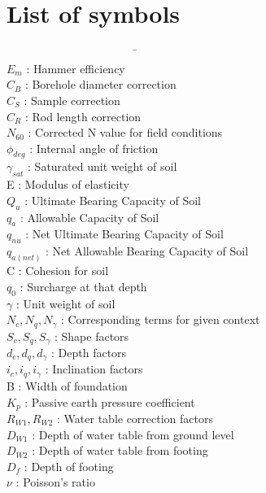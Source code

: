 \chapter*{List of symbols}
\begin{tabbing}
~~~~~~~~~~~~~~~~~~~~~~~\= ~~~~~~~~~~~~~~~~\= \\%
$E_m$ \> : \> Hammer efficiency\\
$C_B$ \> : \> Borehole diameter correction\\
$C_S$ \> : \> Sample correction\\
$C_R$ \> : \> Rod length correction\\
$N_{60}$ \> : \> Corrected N value for field conditions\\
${\phi}_{deg}$ \> : \> Internal angle of friction\\
${\gamma}_{sat}$ \> : \> Saturated unit weight of soil\\
E \> : \> Modulus of elasticity\\
$Q_u$ \> : \> Ultimate Bearing Capacity of Soil \\
$q_a$ \> : \> Allowable Capacity of Soil \\
$q_{nu}$ \> : \> Net Ultimate Bearing Capacity of Soil \\
$q_{a(net)}$ \> : \> Net Allowable Bearing Capacity of Soil \\
C \> : \> Cohesion for soil\\
$q_0$ \> : \> Surcharge at that depth\\
$\gamma$ \> : \> Unit weight of soil\\
$N_c, N_q, N_{\gamma}$ \> : \> Corresponding terms for given context\\
$S_c, S_q, S_{\gamma}$ \> : \> Shape factors\\
$d_c, d_q, d_{\gamma}$ \> : \> Depth factors\\
$i_c, i_q, i_{\gamma}$ \> : \> Inclination factors\\
B \> : \> Width of foundation\\
$K_p$ \> : \> Passive earth pressure coefficient\\
$R_{W1}, R_{W2}$ \> : \> Water table correction factors \\
$D_{W1}$ \> : \> Depth of water table from ground level \\
$D_{W2}$ \> : \> Depth of water table from footing \\
$D_f$ \> : \> Depth of footing \\
$\nu$ \> : \> Poisson's ratio \\

\end{tabbing}
